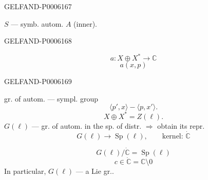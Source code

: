 \begin{GelfandAdjacentEvidence}{GELFAND-P000616}{7}


\(S\) — symb. autom. \(A\) (inner).
\end{GelfandAdjacentEvidence}
\begin{GelfandAdjacentEvidence}{GELFAND-P000616}{8}


\[
a:X\oplus X^*\longrightarrow\mathbb C
\]
\[
a(x,p)
\]
\end{GelfandAdjacentEvidence}
\begin{GelfandAdjacentEvidence}{GELFAND-P000616}{9}

gr. of autom. — sympl. group
\[
\langle p',x\rangle-\langle p,x'\rangle.
\]
\[
X\oplus X^*=Z(\ell).
\]
\(G(\ell)\) — gr. of autom. in the sp. of distr. \(\Rightarrow\) obtain its repr.
\[
G(\ell)\longrightarrow\operatorname{Sp}(\ell),\qquad
\text{kernel: }\dot{\mathbb C}
\]
\end{GelfandAdjacentEvidence}

\[
G(\ell)/\dot{\mathbb C}=\operatorname{Sp}(\ell)
\]
\[
c\in\dot{\mathbb C}=\mathbb C\setminus0
\]
In particular, \(G(\ell)\) — a Lie gr..


